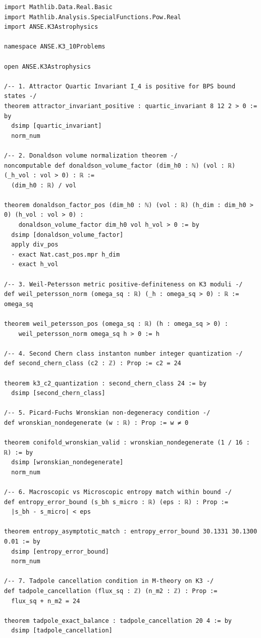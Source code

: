 \documentclass[11pt, a4paper]{article}
\begin{document}
\begin{lstlisting}[language=Lean]
import Mathlib.Data.Real.Basic
import Mathlib.Analysis.SpecialFunctions.Pow.Real
import ANSE.K3Astrophysics

namespace ANSE.K3_10Problems

open ANSE.K3Astrophysics

/-- 1. Attractor Quartic Invariant I_4 is positive for BPS bound states -/
theorem attractor_invariant_positive : quartic_invariant 8 12 2 > 0 := by
  dsimp [quartic_invariant]
  norm_num

/-- 2. Donaldson volume normalization theorem -/
noncomputable def donaldson_volume_factor (dim_h0 : ℕ) (vol : ℝ) (_h_vol : vol > 0) : ℝ :=
  (dim_h0 : ℝ) / vol

theorem donaldson_factor_pos (dim_h0 : ℕ) (vol : ℝ) (h_dim : dim_h0 > 0) (h_vol : vol > 0) :
    donaldson_volume_factor dim_h0 vol h_vol > 0 := by
  dsimp [donaldson_volume_factor]
  apply div_pos
  · exact Nat.cast_pos.mpr h_dim
  · exact h_vol

/-- 3. Weil-Petersson metric positive-definiteness on K3 moduli -/
def weil_petersson_norm (omega_sq : ℝ) (_h : omega_sq > 0) : ℝ := omega_sq

theorem weil_petersson_pos (omega_sq : ℝ) (h : omega_sq > 0) :
    weil_petersson_norm omega_sq h > 0 := h

/-- 4. Second Chern class instanton number integer quantization -/
def second_chern_class (c2 : ℤ) : Prop := c2 = 24

theorem k3_c2_quantization : second_chern_class 24 := by
  dsimp [second_chern_class]

/-- 5. Picard-Fuchs Wronskian non-degeneracy condition -/
def wronskian_nondegenerate (w : ℝ) : Prop := w ≠ 0

theorem conifold_wronskian_valid : wronskian_nondegenerate (1 / 16 : ℝ) := by
  dsimp [wronskian_nondegenerate]
  norm_num

/-- 6. Macroscopic vs Microscopic entropy match within bound -/
def entropy_error_bound (s_bh s_micro : ℝ) (eps : ℝ) : Prop :=
  |s_bh - s_micro| < eps

theorem entropy_asymptotic_match : entropy_error_bound 30.1331 30.1300 0.01 := by
  dsimp [entropy_error_bound]
  norm_num

/-- 7. Tadpole cancellation condition in M-theory on K3 -/
def tadpole_cancellation (flux_sq : ℤ) (n_m2 : ℤ) : Prop :=
  flux_sq + n_m2 = 24

theorem tadpole_exact_balance : tadpole_cancellation 20 4 := by
  dsimp [tadpole_cancellation]


\end{lstlisting}
\end{document}
